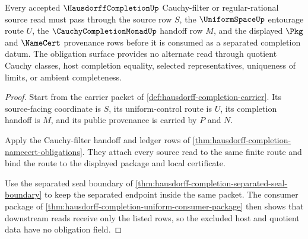 \begin{theorem}
\label{thm:hausdorffcompletion-cauchy-filter-namecert-obligations}
Every accepted $\HausdorffCompletionUp$ Cauchy-filter or regular-rational source read must pass through the source row $S$, the $\UniformSpaceUp$ entourage route $U$, the $\CauchyCompletionMonadUp$ handoff row $M$, and the displayed $\Pkg$ and $\NameCert$ provenance rows before it is consumed as a separated completion datum. The obligation surface provides no alternate read through quotient Cauchy classes, host completion equality, selected representatives, uniqueness of limits, or ambient completeness.
\end{theorem}
\begin{proof}
Start from the carrier packet of \autoref{def:hausdorff-completion-carrier}. Its source-facing coordinate is $S$, its uniform-control route is $U$, its completion handoff is $M$, and its public provenance is carried by $P$ and $N$.

Apply the Cauchy-filter handoff and ledger rows of \autoref{thm:hausdorff-completion-namecert-obligations}. They attach every source read to the same finite route and bind the route to the displayed package and local certificate.

Use the separated seal boundary of \autoref{thm:hausdorff-completion-separated-seal-boundary} to keep the separated endpoint inside the same packet. The consumer package of \autoref{thm:hausdorff-completion-uniform-consumer-package} then shows that downstream reads receive only the listed rows, so the excluded host and quotient data have no obligation field.
\end{proof}

